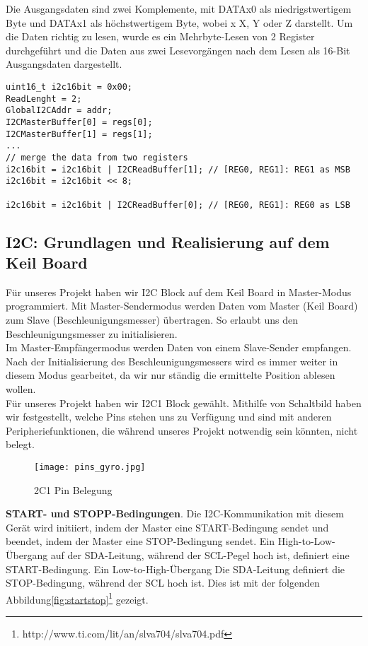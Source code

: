 Die Ausgangsdaten sind zwei Komplemente, mit DATAx0 als niedrigstwertigem Byte und DATAx1 als höchstwertigem Byte, wobei x X, Y oder Z darstellt. Um die Daten richtig zu lesen, wurde es ein Mehrbyte-Lesen von 2 Register durchgeführt und die Daten aus zwei Lesevorgängen nach dem Lesen als 16-Bit Ausgangsdaten dargestellt. 

\begin{lstlisting}
uint16_t i2c16bit = 0x00;
ReadLenght = 2;
GlobalI2CAddr = addr;
I2CMasterBuffer[0] = regs[0];
I2CMasterBuffer[1] = regs[1];
...
// merge the data from two registers
i2c16bit = i2c16bit | I2CReadBuffer[1]; // [REG0, REG1]: REG1 as MSB
i2c16bit = i2c16bit << 8;

i2c16bit = i2c16bit | I2CReadBuffer[0]; // [REG0, REG1]: REG0 as LSB

\end{lstlisting}

\subsection{I2C: Grundlagen und Realisierung auf dem Keil Board}
Für unseres Projekt haben wir I2C Block auf dem Keil Board in Master-Modus programmiert. Mit Master-Sendermodus werden Daten vom Master (Keil Board) zum Slave (Beschleunigungsmesser) übertragen. So erlaubt uns den Beschleunigungsmesser zu initialisieren. \\

Im Master-Empfängermodus werden Daten von einem Slave-Sender empfangen. Nach der Initialisierung des Beschleunigungsmessers wird es immer weiter in diesem Modus gearbeitet, da wir nur ständig die ermittelte Position ablesen wollen. \\

Für unseres Projekt haben wir I2C1 Block gewählt. Mithilfe von Schaltbild haben wir festgestellt, welche Pins stehen uns zu Verfügung und sind mit anderen Peripheriefunktionen, die während unseres Projekt notwendig sein könnten, nicht belegt. 

\begin{figure}[!hb]
	\centering
	\texttt{[image: pins\_gyro.jpg]}
	\caption[I2C1 Pin Belegung]{2C1 Pin Belegung}
	\label{fig:i2cpins}
\end{figure}

\textbf{START- und STOPP-Bedingungen}. Die I2C-Kommunikation mit diesem Gerät wird initiiert, indem der Master eine START-Bedingung sendet und beendet, indem der Master eine STOP-Bedingung sendet. Ein High-to-Low-Übergang auf der SDA-Leitung, während der SCL-Pegel hoch ist, definiert eine START-Bedingung. Ein Low-to-High-Übergang Die SDA-Leitung definiert die STOP-Bedingung, während der SCL hoch ist. Dies ist mit der folgenden Abbildung\ref{fig:startstop}\footnote{http://www.ti.com/lit/an/slva704/slva704.pdf} gezeigt. 

